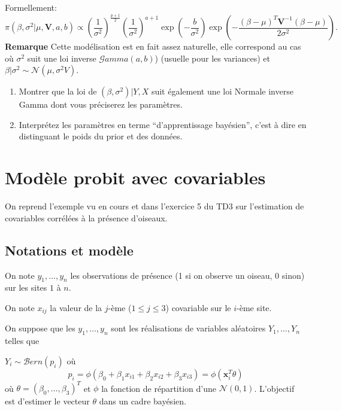 \documentclass[]{article}
\begin{document}
Formellement:
\[\pi(\beta ,\sigma^{2}\vert \mu , \mathbf{V},a ,b )\propto
\left({\frac {1}{\sigma ^{2}}}\right)^{\frac{p +1}{2}}\left({\frac {1}{\sigma ^{2}}}\right)^{a + 1}\exp \left(-\frac{b}{\sigma^2}\right)\exp \left(-{\frac {(\beta -\mu)^T\mathbf {V} ^{-1}(\beta - \mu)}{2\sigma ^{2}}}\right).\]
\textbf{Remarque} Cette modélisation est en fait assez naturelle, elle
correspond au cas où \(\sigma^2\) suit une loi inverse
\(\mathcal{G}amma(a, b)\)) (usuelle pour les variances) et
\(\beta \vert \sigma^2\sim \mathcal{N}(\mu, \sigma^2V)\).

\begin{enumerate}
\def\labelenumi{\arabic{enumi}.}
\item
  Montrer que la loi de \((\beta,\sigma^2)\vert Y, X\) suit également
  une loi Normale inverse Gamma dont vous préciserez les paramètres.
\item
  Interprétez les paramètres en terme ``d'apprentissage bayésien'',
  c'est à dire en distinguant le poids du prior et des données.
\end{enumerate}

\hypertarget{moduxe8le-probit-avec-covariables}{%
\section{Modèle probit avec
covariables}\label{moduxe8le-probit-avec-covariables}}

On reprend l'exemple vu en cours et dans l'exercice 5 du TD3 sur
l'estimation de covariables corrélées à la présence d'oiseaux.

\hypertarget{notations-et-moduxe8le}{%
\subsection{Notations et modèle}\label{notations-et-moduxe8le}}

On note \(y_1, \dots, y_n\) les observations de présence (1 si on
observe un oiseau, 0 sinon) sur les sites \(1\) à \(n\).

On note \(x_{ij}\) la valeur de la \(j\)-ème (\(1\leq j \leq 3\))
covariable sur le \(i\)-ème site.

On suppose que les \(y_1, \dots, y_n\) sont les réalisations de
variables aléatoires \(Y_1, \dots, Y_n\) telles que

\(Y_i \sim \mathcal{B}ern(p_i)\) où
\[p_i = \phi(\beta_0 + \beta_1 x_{i1} + \beta_2x_{i2} + \beta_3 x_{i3}) = \phi(\mathbf{x}_i^T\theta)\]
où \(\theta = (\beta_0,\dots, \beta_3)^T\) et \(\phi\) la fonction de
répartition d'une \(\mathcal{N}(0, 1)\). L'objectif est d'estimer le
vecteur \(\theta\) dans un cadre bayésien.
\end{document}
